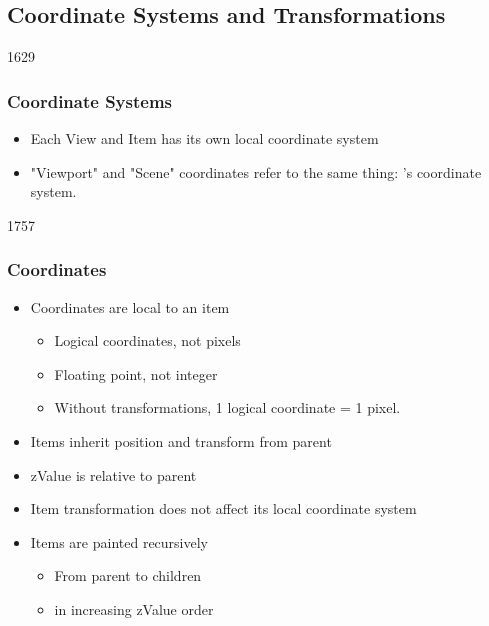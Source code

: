 %
%
%
%


\subsection{Coordinate Systems and Transformations}


\begin{slide}{1629}\frametitle{Coordinate Systems}

\begin{itemize}
\item Each View and Item has its own local coordinate system
\item "Viewport" and "Scene" coordinates refer to the same thing:  's coordinate system.

\end{itemize}
\end{slide}



\begin{slide}{1757}

\frametitle{Coordinates}
\begin{itemize}
\item Coordinates are local to an item
    \begin{itemize}
    \item Logical coordinates, not pixels
    \item Floating point, not integer
    \item Without transformations, 1 logical coordinate = 1 pixel.
    \end{itemize}   
\item Items inherit position and transform from parent
\item zValue is relative to parent
\item Item transformation does not affect its local coordinate system
\item Items are painted recursively
    \begin{itemize}
    \item From parent to children
    \item in increasing zValue order
    \end{itemize}
\end{itemize}
\end{slide}


